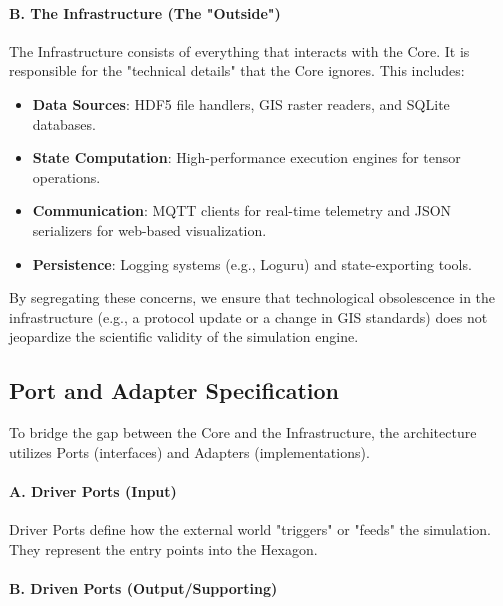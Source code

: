 \paragraph{B. The Infrastructure (The "Outside")}

The Infrastructure consists of everything that interacts with the Core. It is responsible for the "technical details" that the Core 
ignores. This includes:

\begin{itemize}
    \item \textbf{Data Sources}: HDF5 file handlers, GIS raster readers, and SQLite databases.

    \item \textbf{State Computation}: High-performance execution engines for tensor operations.

    \item \textbf{Communication}: MQTT clients for real-time telemetry and JSON serializers for web-based visualization.

    \item \textbf{Persistence}: Logging systems (e.g., Loguru) and state-exporting tools.
\end{itemize}

By segregating these concerns, we ensure that technological obsolescence in the infrastructure (e.g., a protocol update or a change 
in GIS standards) does not jeopardize the scientific validity of the simulation engine.


\subsection{Port and Adapter Specification}

To bridge the gap between the Core and the Infrastructure, the architecture utilizes Ports (interfaces) and Adapters (implementations).

\paragraph{A. Driver Ports (Input)}

Driver Ports define how the external world "triggers" or "feeds" the simulation. They represent the entry points into the Hexagon.

\paragraph{B. Driven Ports (Output/Supporting)}

